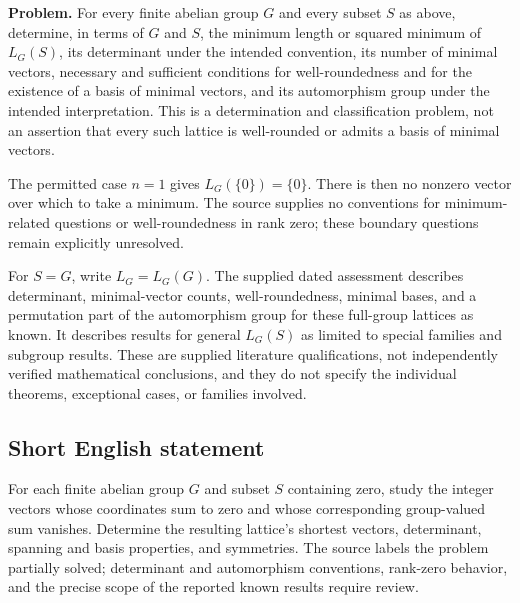 \documentclass[11pt]{article}
\begin{document}
\textbf{Problem.} For every finite abelian group \(G\) and every subset \(S\) as above, determine, in terms of \(G\) and \(S\), the minimum length or squared minimum of \(L_G(S)\), its determinant under the intended convention, its number of minimal vectors, necessary and sufficient conditions for well-roundedness and for the existence of a basis of minimal vectors, and its automorphism group under the intended interpretation. This is a determination and classification problem, not an assertion that every such lattice is well-rounded or admits a basis of minimal vectors.

The permitted case \(n=1\) gives \(L_G(\{0\})=\{0\}\). There is then no nonzero vector over which to take a minimum. The source supplies no conventions for minimum-related questions or well-roundedness in rank zero; these boundary questions remain explicitly unresolved.

For \(S=G\), write \(L_G=L_G(G)\). The supplied dated assessment describes determinant, minimal-vector counts, well-roundedness, minimal bases, and a permutation part of the automorphism group for these full-group lattices as known. It describes results for general \(L_G(S)\) as limited to special families and subgroup results. These are supplied literature qualifications, not independently verified mathematical conclusions, and they do not specify the individual theorems, exceptional cases, or families involved.
\subsection{Short English statement}
For each finite abelian group \(G\) and subset \(S\) containing zero, study the integer vectors whose coordinates sum to zero and whose corresponding group-valued sum vanishes. Determine the resulting lattice's shortest vectors, determinant, spanning and basis properties, and symmetries. The source labels the problem partially solved; determinant and automorphism conventions, rank-zero behavior, and the precise scope of the reported known results require review.
\end{document}
